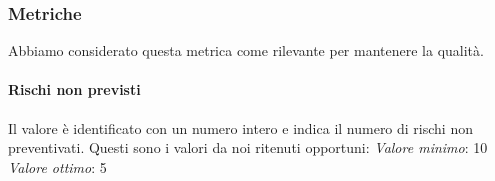 \subsubsection{Metriche}
Abbiamo considerato questa metrica come rilevante per mantenere la qualità.
\paragraph{Rischi non previsti}
Il valore è identificato con un numero intero e indica il numero di rischi non preventivati.
Questi sono i valori da noi ritenuti opportuni:
\textit{Valore minimo}: 10\\
\textit{Valore ottimo}: 5\\